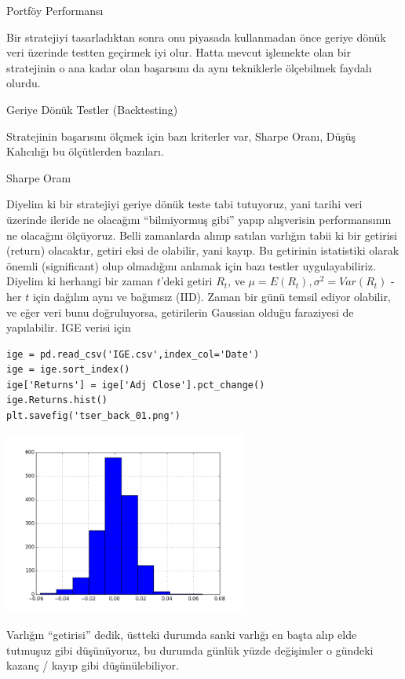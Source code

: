\documentclass[12pt,fleqn]{article}\usepackage{../../common}
\begin{document}
Portföy Performansı

Bir stratejiyi tasarladıktan sonra onu piyasada kullanmadan önce geriye dönük
veri üzerinde testten geçirmek iyi olur. Hatta mevcut işlemekte olan bir
stratejinin o ana kadar olan başarısını da aynı tekniklerle ölçebilmek
faydalı olurdu.

Geriye Dönük Testler (Backtesting)

Stratejinin başarısını ölçmek için bazı kriterler var, Sharpe Oranı, Düşüş
Kalıcılığı bu ölçütlerden bazıları.

Sharpe Oranı 

Diyelim ki bir stratejiyi geriye dönük teste tabi tutuyoruz, yani tarihi veri
üzerinde ileride ne olacağını ``bilmiyormuş gibi'' yapıp alışverisin
performansının ne olacağını ölçüyoruz. Belli zamanlarda alınıp satılan varlığın
tabii ki bir getirisi (return) olacaktır, getiri eksi de olabilir, yani
kayıp. Bu getirinin istatistiki olarak önemli (significant) olup olmadığını
anlamak için bazı testler uygulayabiliriz. Diyelim ki herhangi bir zaman
$t$'deki getiri $R_t$, ve $\mu = E(R_t), \sigma^2=Var(R_t)$ - her $t$ için
dağılım aynı ve bağımsız (IID). Zaman bir günü temsil ediyor olabilir, ve eğer
veri bunu doğruluyorsa, getirilerin Gaussian olduğu faraziyesi de
yapılabilir. IGE verisi için

\begin{verbatim}
ige = pd.read_csv('IGE.csv',index_col='Date')
ige = ige.sort_index()
ige['Returns'] = ige['Adj Close'].pct_change()
ige.Returns.hist()
plt.savefig('tser_back_01.png')
\end{verbatim}

\includegraphics[height=6cm]{tser_back_01.png}

Varlığın ``getirisi'' dedik, üstteki durumda sanki varlığı en başta alıp
elde tutmuşuz gibi düşünüyoruz, bu durumda günlük yüzde değişimler o gündeki
kazanç / kayıp gibi düşünülebiliyor. 
\end{document}
